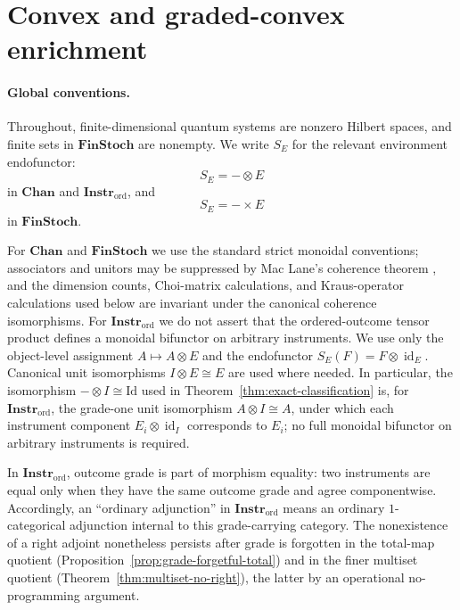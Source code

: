 \documentclass[11pt]{article}
\DeclareMathOperator{\id}{id}
\begin{document}
\section{Convex and graded-convex enrichment}
\label{sec:enrichment}

\paragraph{Global conventions.}
Throughout, finite-dimensional quantum systems are nonzero Hilbert spaces,
and finite sets in $\mathbf{FinStoch}$ are nonempty. We write $S_E$ for the
relevant environment endofunctor:
\[
S_E=-\otimes E
\]
in $\mathbf{Chan}$ and $\mathbf{Instr}_{\mathrm{ord}}$, and
\[
S_E=-\times E
\]
in $\mathbf{FinStoch}$.

For $\mathbf{Chan}$ and $\mathbf{FinStoch}$ we use the standard strict
monoidal conventions; associators and unitors may be suppressed by Mac Lane's
coherence theorem \cite{MacLane1998}, and the dimension counts,
Choi-matrix calculations, and Kraus-operator calculations used below are
invariant under the canonical coherence isomorphisms. For
$\mathbf{Instr}_{\mathrm{ord}}$ we do not assert that the ordered-outcome
tensor product defines a monoidal bifunctor on arbitrary instruments. We use
only the object-level assignment $A\mapsto A\otimes E$ and the endofunctor
$S_E(F)=F\otimes\id_E$. Canonical unit isomorphisms $I\otimes E\cong E$ are
used where needed. In particular, the isomorphism
$-\otimes I\cong\mathrm{Id}$ used in
Theorem~\ref{thm:exact-classification} is, for
$\mathbf{Instr}_{\mathrm{ord}}$, the grade-one unit isomorphism
$A\otimes I\cong A$, under which each instrument component
$E_i\otimes\id_I$ corresponds to $E_i$; no full monoidal bifunctor on
arbitrary instruments is required.

In $\mathbf{Instr}_{\mathrm{ord}}$, outcome grade is part of morphism
equality: two instruments are equal only when they have the same outcome grade
and agree componentwise. Accordingly, an ``ordinary adjunction'' in
$\mathbf{Instr}_{\mathrm{ord}}$ means an ordinary $1$-categorical adjunction
internal to this grade-carrying category. The nonexistence of a right adjoint
nonetheless persists after grade is forgotten in the total-map quotient
(Proposition~\ref{prop:grade-forgetful-total}) and in the finer multiset quotient
(Theorem~\ref{thm:multiset-no-right}), the latter by an operational
no-programming argument.
\end{document}
